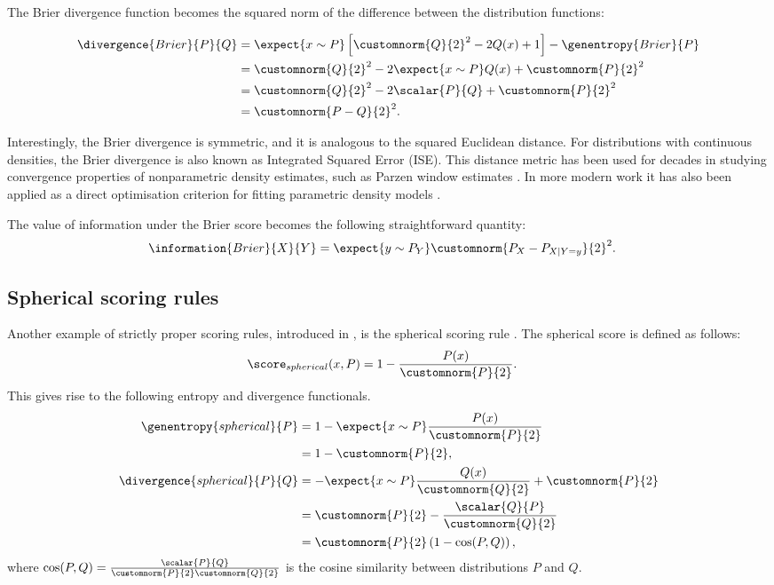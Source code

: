 The Brier divergence function becomes the squared norm of the difference between the distribution functions:

\begin{align}
	\divergence{Brier}{P}{Q} &= \expect{x \sim P}\left[\customnorm{Q}{2}^2 - 2Q(x) + 1\right] - \genentropy{Brier}{P} \\
		&= \customnorm{Q}{2}^2 -2 \expect{x \sim P} Q(x) + \customnorm{P}{2}^2 \\
		&= \customnorm{Q}{2}^2 - 2\scalar{P}{Q} + \customnorm{P}{2}^2\\
		&= \customnorm{P-Q}{2}^2. \label{eqn:Brier_divergence}
\end{align}

\cbstart
Interestingly, the Brier divergence is symmetric, and it is analogous to the squared Euclidean distance. For distributions with continuous densities, the Brier divergence is also known as Integrated Squared Error (ISE). This distance metric has been used for decades in studying convergence properties of nonparametric density estimates, such as Parzen window estimates \citep{Parzen62}. In more modern work it has also been applied as a direct optimisation criterion for fitting parametric density models \citep[see \eg][]{Scott99,Mukherjee99,Girolami03}.
\cbend

The value of information under the Brier score becomes the following straightforward quantity:
%
\begin{align}
	\information{Brier}{X}{Y} &= \expect{y \sim P_{Y}} \customnorm{P_X - P_{X\vert Y=y}}{2}^2.
\end{align}

\subsection{Spherical scoring rules}
Another example of strictly proper scoring rules, introduced in \citep{Good1971}, is the spherical scoring rule \citep{Dawid2007,Dawid2012}. The spherical score is defined as follows:
%
\begin{align}
	\score_{spherical}(x,P) &= 1 -\frac{P(x)}{\customnorm{P}{2}}.
\end{align}
%
This gives rise to the following entropy and divergence functionals.
%
\begin{align}
	\genentropy{spherical}{P} &= 1 -\expect{x \sim P}\frac{P(x)}{\customnorm{P}{2}}\\
		&= 1 -\customnorm{P}{2},\\
	\divergence{spherical}{P}{Q} &= -\expect{x \sim P}\frac{Q(x)}{\customnorm{Q}{2}} + \customnorm{P}{2}\\
		&= \customnorm{P}{2} - \frac{\scalar{Q}{P}}{\customnorm{Q}{2}}\\
		&= \customnorm{P}{2}\left( 1 - \cos(P,Q) \right),
\end{align}
%
where $\cos(P,Q) = \frac{\scalar{P}{Q}}{\customnorm{P}{2}\customnorm{Q}{2}}$ is the cosine similarity between distributions $P$ and $Q$.

